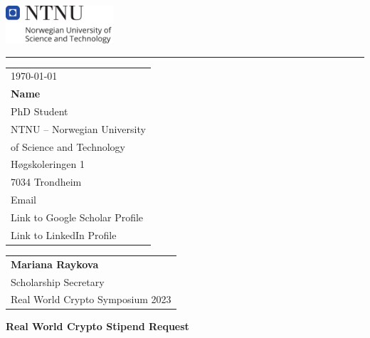 \documentclass{article}
\begin{document}

\includegraphics[width=0.3\textwidth]{ntnu_hoeyde_eng.pdf} %

\vspace{-1em} %

\rule{\linewidth}{1pt} %

\bigskip%


\hfill
\begin{tabular}{l @{}}
	\today \bigskip\\ %
    \textbf{Name} \\
    PhD Student\\
	NTNU -- Norwegian University\\of Science and Technology \\ %
	Høgskoleringen 1\\ 7034 Trondheim \\
	Email\\
    Link to Google Scholar Profile\\
    Link to LinkedIn Profile
\end{tabular}

\bigskip %


\begin{tabular}{@{} l}
	\textbf{Mariana Raykova} \\
	  Scholarship Secretary \\
	Real World Crypto Symposium 2023
\end{tabular}

\bigskip %

\textbf{Real World Crypto Stipend Request}
\end{document}
